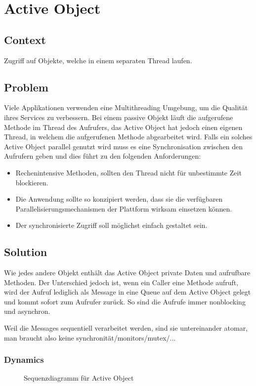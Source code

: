 \chapter{Active Object}

\section{Context}
Zugriff auf Objekte, welche in einem separaten Thread laufen.

\section{Problem}
Viele Applikationen verwenden eine Multithreading Umgebung, um die Qualität ihres Services zu verbessern. Bei einem passive Objekt läuft die aufgerufene Methode im Thread des Aufrufers, das Active Object hat jedoch einen eigenen Thread, in welchem die aufgerufenen Methode abgearbeitet wird. Falls ein solches Active Object parallel genutzt wird muss es eine Synchronisation zwischen den Aufrufern geben und dies führt zu den folgenden Anforderungen:
\begin{itemize}
  \item Rechenintensive Methoden, sollten den Thread nicht für unbestimmte Zeit blockieren.
  \item Die Anwendung sollte so konzipiert werden, dass sie die verfügbaren Parallelisierungsmechanismen der Plattform wirksam einsetzen können.
  \item Der synchronisierte Zugriff soll möglichst einfach gestaltet sein.
\end{itemize}

\section{Solution}
Wie jedes andere Objekt enthält das Active Object private Daten und aufrufbare Methoden. Der Unterschied jedoch ist, wenn ein Caller eine Methode aufruft, wird der Aufruf lediglich als Message in eine Queue auf dem Active Object gelegt und kommt sofort zum Aufrufer zurück. So sind die Aufrufe immer nonblocking und asynchron.

Weil die Messages sequentiell verarbeitet werden, sind sie untereinander atomar, man braucht also keine synchronität/monitors/mutex/...
\subsection{Dynamics}
\begin{figure}[H]
  \centering
  
  \caption{Sequenzdiagramm f\"ur Active Object}
\end{figure}
